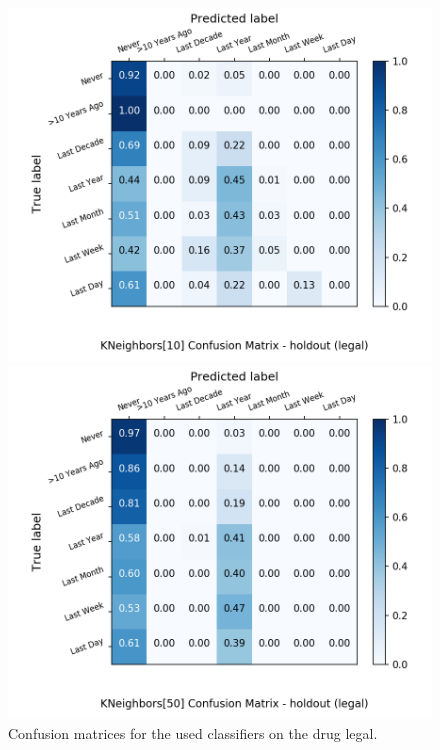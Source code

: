 \begin{figure}[H]
\begin{minipage}[b]{0.32\textwidth}
		\includegraphics[width=1.1\textwidth]{Plots/drugs/legal_KNeighbors_10_balance_False_holdout.png}
  \end{minipage}
	\begin{minipage}[b]{0.32\textwidth}
		\includegraphics[width=1.1\textwidth]{Plots/drugs/legal_KNeighbors_50_balance_False_holdout.png}
  \end{minipage}
	\caption{Confusion matrices for the used classifiers on the drug legal.}
\end{figure}

